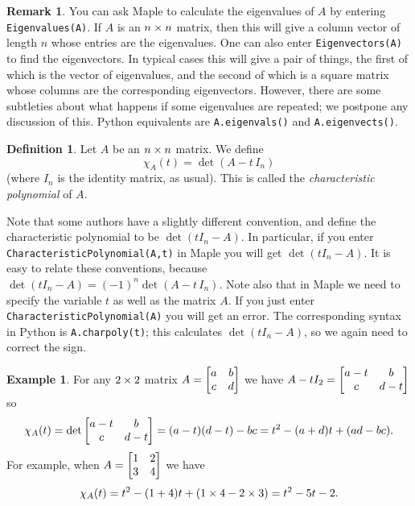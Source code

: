 \documentclass[reqno]{amsart}
\theoremstyle{definition}
\newtheorem{remark}[theorem]{Remark}
\newtheorem{definition}[theorem]{Definition}
\newtheorem{example}[theorem]{Example}
\newcommand{\dfn}[1]{\emph{{#1}}\index{#1}}
\begin{document}
\begin{remark}
 You can ask Maple to calculate the eigenvalues of $A$ by entering
 \verb+Eigenvalues(A)+.  If $A$ is an $n\times n$ matrix, then this will
 give a column vector of length $n$ whose entries are the
 eigenvalues.  One can also enter \verb+Eigenvectors(A)+ to find the
 eigenvectors.  In typical cases this will give a pair of things, the
 first of which is the vector of eigenvalues, and the second of which
 is a square matrix whose columns are the corresponding eigenvectors.
 However, there are some subtleties about what happens if some
 eigenvalues are repeated; we postpone any discussion of this.  Python
 equivalents are \verb|A.eigenvals()| and \verb|A.eigenvects()|.
\end{remark}

\begin{definition}\label{defn-chi}
 Let $A$ be an $n\times n$ matrix.  We define
 \[ \chi_A(t) = \det(A-t\,I_n) \]
 (where $I_n$ is the identity matrix, as usual).  This is called the
 \dfn{characteristic polynomial} of $A$.
\end{definition}

Note that some authors have a slightly different convention, and
define the characteristic polynomial to be $\det(t I_n-A)$.  In
particular, if you enter \verb+CharacteristicPolynomial(A,t)+ in Maple
you will get $\det(t I_n-A)$.  It is easy to relate these conventions,
because $\det(t I_n-A)=(-1)^n\det(A-t\,I_n)$.  Note also that in Maple
we need to specify the variable $t$ as well as the matrix $A$.  If you
just enter \verb+CharacteristicPolynomial(A)+ you will get an error.
The corresponding syntax in Python is \verb|A.charpoly(t)|; this
calculates $\det(tI_n-A)$, so we again need to correct the sign.

\begin{example}\label{eg-chi-two}
 For any $2\times 2$ matrix $A=\left[\begin{matrix} a&b \\ c&d\end{matrix}\right]$ we have
 $A-tI_2=\left[\begin{matrix} a-t & b \\ c & d-t\end{matrix}\right]$ so
 \[ \chi_A(t) = \det\left[\begin{matrix} a-t & b \\ c & d-t\end{matrix}\right] =
     (a-t)(d-t) - bc = t^2 - (a+d)t + (ad-bc).
 \]
 For example, when $A=\left[\begin{matrix} 1 & 2 \\ 3 & 4 \end{matrix}\right]$ we have
 \[ \chi_A(t) = t^2 - (1+4) t + (1\times 4-2\times 3)
     = t^2 - 5t - 2.
 \]
\end{example}
\end{document}
